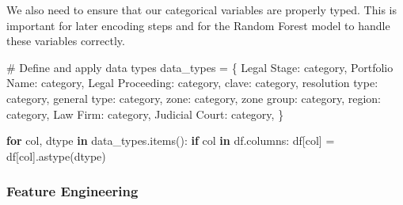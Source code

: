 \documentclass[
  letterpaper,
  DIV=11,
  numbers=noendperiod]{scrartcl}
\newenvironment{Shaded}{\begin{snugshade}}{\end{snugshade}}
\newcommand{\CommentTok}[1]{\textcolor[rgb]{0.37,0.37,0.37}{#1}}
\newcommand{\ControlFlowTok}[1]{\textcolor[rgb]{0.00,0.23,0.31}{\textbf{#1}}}
\newcommand{\KeywordTok}[1]{\textcolor[rgb]{0.00,0.23,0.31}{\textbf{#1}}}
\newcommand{\NormalTok}[1]{\textcolor[rgb]{0.00,0.23,0.31}{#1}}
\newcommand{\OperatorTok}[1]{\textcolor[rgb]{0.37,0.37,0.37}{#1}}
\newcommand{\StringTok}[1]{\textcolor[rgb]{0.13,0.47,0.30}{#1}}
\begin{document}
We also need to ensure that our categorical variables are properly
typed. This is important for later encoding steps and for the Random
Forest model to handle these variables correctly.

\begin{Shaded}
\begin{Highlighting}[]
\CommentTok{\# Define and apply data types}
\NormalTok{data\_types }\OperatorTok{=}\NormalTok{ \{}
    \StringTok{\textquotesingle{}Legal Stage\textquotesingle{}}\NormalTok{: }\StringTok{\textquotesingle{}category\textquotesingle{}}\NormalTok{,}
    \StringTok{\textquotesingle{}Portfolio Name\textquotesingle{}}\NormalTok{: }\StringTok{\textquotesingle{}category\textquotesingle{}}\NormalTok{,}
    \StringTok{\textquotesingle{}Legal Proceeding\textquotesingle{}}\NormalTok{: }\StringTok{\textquotesingle{}category\textquotesingle{}}\NormalTok{,}
    \StringTok{\textquotesingle{}clave\textquotesingle{}}\NormalTok{: }\StringTok{\textquotesingle{}category\textquotesingle{}}\NormalTok{,}
    \StringTok{\textquotesingle{}resolution type\textquotesingle{}}\NormalTok{: }\StringTok{\textquotesingle{}category\textquotesingle{}}\NormalTok{,}
    \StringTok{\textquotesingle{}general type\textquotesingle{}}\NormalTok{: }\StringTok{\textquotesingle{}category\textquotesingle{}}\NormalTok{,}
    \StringTok{\textquotesingle{}zone\textquotesingle{}}\NormalTok{: }\StringTok{\textquotesingle{}category\textquotesingle{}}\NormalTok{,}
    \StringTok{\textquotesingle{}zone group\textquotesingle{}}\NormalTok{: }\StringTok{\textquotesingle{}category\textquotesingle{}}\NormalTok{,}
    \StringTok{\textquotesingle{}region\textquotesingle{}}\NormalTok{: }\StringTok{\textquotesingle{}category\textquotesingle{}}\NormalTok{,}
    \StringTok{\textquotesingle{}Law Firm\textquotesingle{}}\NormalTok{: }\StringTok{\textquotesingle{}category\textquotesingle{}}\NormalTok{,}
    \StringTok{\textquotesingle{}Judicial Court\textquotesingle{}}\NormalTok{: }\StringTok{\textquotesingle{}category\textquotesingle{}}\NormalTok{,}
\NormalTok{\}}

\ControlFlowTok{for}\NormalTok{ col, dtype }\KeywordTok{in}\NormalTok{ data\_types.items():}
    \ControlFlowTok{if}\NormalTok{ col }\KeywordTok{in}\NormalTok{ df.columns:}
\NormalTok{        df[col] }\OperatorTok{=}\NormalTok{ df[col].astype(dtype)}
\end{Highlighting}
\end{Shaded}

\subsubsection{Feature Engineering}\label{sec-feature-engineering}
\end{document}
